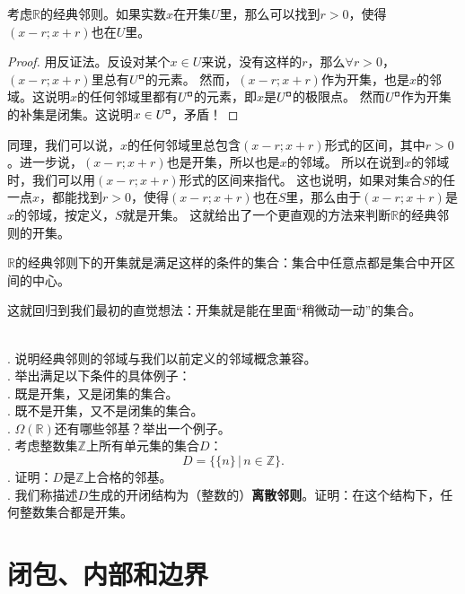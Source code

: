 \documentclass[12pt,UTF8,fontset=none]{ctexbook}
\begin{document}
\begin{appendix}
\begin{tm}\label{tm:a-1-30}
    考虑$\mathbb{R}$的经典邻则。如果实数$x$在开集$U$里，那么可以找到$r>0$，使得$(x-r;x+r)$也在$U$里。
\end{tm}

\begin{proof}
    用反证法。反设对某个$x\in U$来说，没有这样的$r$，那么$\forall r>0$，$(x-r;x+r)$里总有$U^{\bu}$的元素。
    然而，$(x-r;x+r)$作为开集，也是$x$的邻域。这说明$x$的任何邻域里都有$U^{\bu}$的元素，即$x$是$U^{\bu}$的极限点。
    然而$U^{\bu}$作为开集的补集是闭集。这说明$x\in U^{\bu}$，矛盾！
\end{proof}

同理，我们可以说，$x$的任何邻域里总包含$(x-r;x+r)$形式的区间，其中$r>0$。进一步说，$(x-r;x+r)$也是开集，所以也是$x$的邻域。
所以在说到$x$的邻域时，我们可以用$(x-r;x+r)$形式的区间来指代。
这也说明，如果对集合$S$的任一点$x$，都能找到$r>0$，使得$(x-r;x+r)$也在$S$里，那么由于$(x-r;x+r)$是$x$的邻域，按定义，$S$就是开集。
这就给出了一个更直观的方法来判断$\mathbb{R}$的经典邻则的开集。

\begin{tm}\label{tm:a-1-40}
    $\mathbb{R}$的经典邻则下的开集就是满足这样的条件的集合：集合中任意点都是集合中开区间的中心。
\end{tm}
这就回归到我们最初的直觉想法：开集就是能在里面“稍微动一动”的集合。

\begin{xt}
    \mbox{} \\
    . 说明经典邻则的邻域与我们以前定义的邻域概念兼容。\\
    . 举出满足以下条件的具体例子：\\
    . 既是开集，又是闭集的集合。\\
    . 既不是开集，又不是闭集的集合。\\
    . $\Omega(\mathbb{R})$还有哪些邻基？举出一个例子。\\
    . 考虑整数集$\mathbb{Z}$上所有单元集的集合$D$：
    $$ D = \{\{n\} \, | \, n \in  \mathbb{Z}\}.$$
    . 证明：$D$是$\mathbb{Z}$上合格的邻基。\\
    . 我们称描述$D$生成的开闭结构为（整数的）\textbf{离散邻则}。证明：在这个结构下，任何整数集合都是开集。
\end{xt}

\section{闭包、内部和边界}


\end{appendix}
\end{document}
